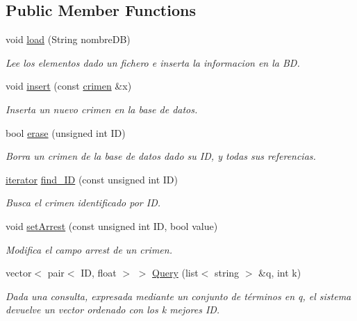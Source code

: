 \subsection*{Public Member Functions}
\begin{DoxyCompactItemize}
\item 
void \hyperlink{classCSS_a64c9a57b619f9d14b0a1c7f483a3f1cc}{load} (String nombre\+D\+B)
\begin{DoxyCompactList}\small\item\em Lee los elementos dado un fichero e inserta la informacion en la B\+D. \end{DoxyCompactList}\item 
void \hyperlink{classCSS_aa91d167f48777dee663cc04ecdfbbf94}{insert} (const \hyperlink{classcrimen}{crimen} \&x)
\begin{DoxyCompactList}\small\item\em Inserta un nuevo crimen en la base de datos. \end{DoxyCompactList}\item 
bool \hyperlink{classCSS_a2c783f8e37c103cf317c2fd11864a796}{erase} (unsigned int I\+D)
\begin{DoxyCompactList}\small\item\em Borra un crimen de la base de datos dado su I\+D, y todas sus referencias. \end{DoxyCompactList}\item 
\hyperlink{classCSS_1_1iterator}{iterator} \hyperlink{classCSS_a6c33bc18a1eee7db2c6557ca8a06f292}{find\+\_\+\+I\+D} (const unsigned int I\+D)
\begin{DoxyCompactList}\small\item\em Busca el crimen identificado por I\+D. \end{DoxyCompactList}\item 
void \hyperlink{classCSS_ae63486750a33cba9bb04d07a308bfbbb}{set\+Arrest} (const unsigned int I\+D, bool value)
\begin{DoxyCompactList}\small\item\em Modifica el campo arrest de un crimen. \end{DoxyCompactList}\item 
vector$<$ pair$<$ I\+D, float $>$ $>$ \hyperlink{classCSS_a722ce77260c4f3f3b324a218c31a65c1}{Query} (list$<$ string $>$ \&q, int k)
\begin{DoxyCompactList}\small\item\em Dada una consulta, expresada mediante un conjunto de términos en q, el sistema devuelve un vector ordenado con los k mejores I\+D. \end{DoxyCompactList}\item 

\end{DoxyCompactItemize}
